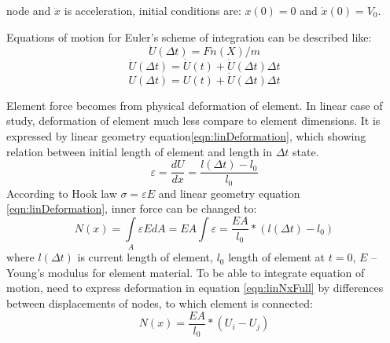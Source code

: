 node and $\ddot{x}$ is acceleration, initial conditions are: $x(0)=0$ and
$\dot{x}(0)=V_0$.\par Equations of motion for Euler's scheme of integration can
be described like:
\begin{equation}\label{eqn:Accel}
  \ddot{U}(\Delta t)=Fn(X)/m
\end{equation}
\begin{equation}\label{eqn:Velos}
  \dot{U}(\Delta t)=\dot{U}(t)+\ddot{U}(\Delta t)\Delta t
\end{equation}
\begin{equation}\label{eqn:Displ}
  U(\Delta t)=U(t)+\dot{U}(\Delta t)\Delta t
\end{equation}
\par Element force becomes from physical deformation of
element. In linear case of study, deformation of element much less compare to
element dimensions. It is expressed by linear geometry
equation\eqref{eqn:linDeformation}, which showing relation between initial
length of element and length in $\Delta t$ state.
\begin{equation}\label{eqn:linDeformation}
  \varepsilon=\frac{dU}{dx}=\frac{l(\Delta t)-l_0}{l_0}
\end{equation}
According to Hook law $\sigma=\varepsilon E$ and linear geometry equation
\eqref{eqn:linDeformation}, inner force can be changed to:
\begin{equation}\label{eqn:linNxFull}
  N(x)= \int\limits_A \varepsilon EdA=EA\int \varepsilon=\frac{EA}{l_0}*(l(\Delta t)-l_0)
\end{equation}
where $l(\Delta t)$ is current length of element, $l_0$ length of element at
$t=0$, $E$ – Young’s modulus for element material. To be able to integrate
equation of motion, need to express deformation in equation
\eqref{eqn:linNxFull} by differences between displacements of nodes, to which
element is connected:
\begin{equation}\label{eqn:linNxWdispl}
  N(x)=\frac{EA}{l_0}*(U_{i}-U_{j})
\end{equation}\par
